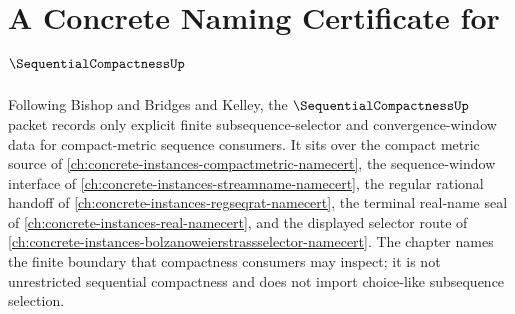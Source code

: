 \chapter{A Concrete Naming Certificate for $\SequentialCompactnessUp$}
\label{ch:concrete-instances-sequential-compactness-namecert}

Following Bishop and Bridges and Kelley, the $\SequentialCompactnessUp$ packet records only explicit finite subsequence-selector and convergence-window data for compact-metric sequence consumers. It sits over the compact metric source of \autoref{ch:concrete-instances-compactmetric-namecert}, the sequence-window interface of \autoref{ch:concrete-instances-streamname-namecert}, the regular rational handoff of \autoref{ch:concrete-instances-regseqrat-namecert}, the terminal real-name seal of \autoref{ch:concrete-instances-real-namecert}, and the displayed selector route of \autoref{ch:concrete-instances-bolzanoweierstrassselector-namecert}. The chapter names the finite boundary that compactness consumers may inspect; it is not unrestricted sequential compactness and does not import choice-like subsequence selection.

